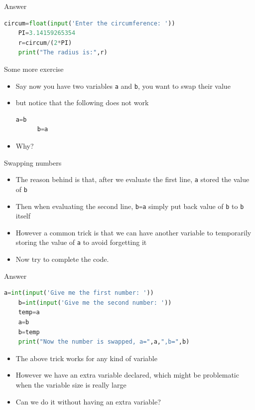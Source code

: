 \documentclass[10pt,xcolor={table,dvipsnames},t]{beamer}
\begin{document}
\begin{frame}[fragile]{Answer}
  \begin{lstlisting}[language=python]
    circum=float(input('Enter the circumference: '))
    PI=3.14159265354
    r=circum/(2*PI)
    print("The radius is:",r)\end{lstlisting}
\end{frame}

\begin{frame}[fragile]{Some more exercise}
  \begin{itemize}
    \item Say now you have two variables \texttt{a} and \texttt{b}, you want to swap their value
    \item but notice that the following does not work
    \begin{lstlisting}[language=python]
      a=b
      b=a\end{lstlisting}
    \item Why?
  \end{itemize}
\end{frame}

\begin{frame}[fragile]{Swapping numbers}
  \begin{itemize}
    \item The reason behind is that, after we evaluate the first line, \texttt{a} stored the value of \texttt{b}
    \item Then when evaluating the second line, \lstinline[language=python,columns=fixed]{b=a} simply put back value of \texttt{b} to \texttt{b} itself
    \item However a common trick is that we can have another variable to temporarily storing the value of \texttt{a} to avoid forgetting it
    \item Now try to complete the code.
  \end{itemize}
\end{frame}

\begin{frame}[fragile]{Answer}
  \begin{lstlisting}[language=python]
    a=int(input('Give me the first number: '))
    b=int(input('Give me the second number: '))
    temp=a
    a=b
    b=temp
    print("Now the number is swapped, a=",a,",b=",b)\end{lstlisting}
  \begin{itemize}
    \item The above trick works for any kind of variable
    \item However we have an extra variable declared, which might be problematic when the variable size is really large
    \item Can we do it without having an extra variable?
  \end{itemize}
\end{frame}
\end{document}
